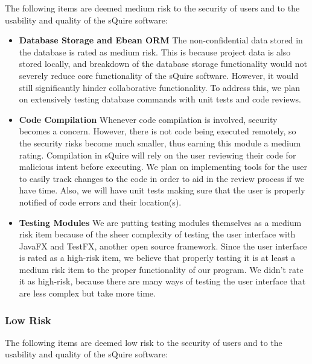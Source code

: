\documentclass[twoside,letterpaper]{article}
\begin{document}
The following items are deemed medium risk to the security of users and to the usability and quality of the sQuire software:

\begin{itemize}
	\item \textbf{Database Storage and Ebean ORM} 
	The non-confidential data stored in the database is rated as medium risk. This is because project data is also stored locally, and breakdown of the database storage functionality would not severely reduce core functionality of the sQuire software. However, it would still significantly hinder collaborative functionality. To address this, we plan on extensively testing database commands with unit tests and code reviews.
	
	\item \textbf{Code Compilation} 
	Whenever code compilation is involved, security becomes a concern. However, there is not code being executed remotely, so the security risks become much smaller, thus earning this module a medium rating. Compilation in sQuire will rely on the user reviewing their code for malicious intent before executing. We plan on implementing tools for the user to easily track changes to the code in order to aid in the review process if we have time. Also, we will have unit tests making sure that the user is properly notified of code errors and their location(s).
	
	\item \textbf{Testing Modules} 
	We are putting testing modules themselves as a medium risk item because of the sheer complexity of testing the user interface with JavaFX and TestFX, another open source framework. Since the user interface is rated as a high-risk item, we believe that properly testing it is at least a medium risk item to the proper functionality of our program. We didn't rate it as high-risk, because there are many ways of testing the user interface that are less complex but take more time.
\end{itemize}

\subsubsection{Low Risk}

The following items are deemed low risk to the security of users and to the usability and quality of the sQuire software:
\end{document}
